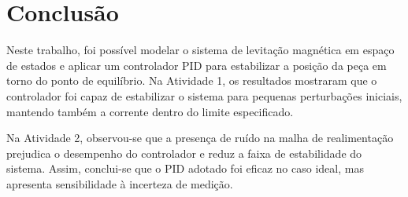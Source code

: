\section{Conclusão}

Neste trabalho, foi possível modelar o sistema de levitação magnética em espaço de estados e aplicar um controlador PID para estabilizar a posição da peça em torno do ponto de equilíbrio. Na Atividade 1, os resultados mostraram que o controlador foi capaz de estabilizar o sistema para pequenas perturbações iniciais, mantendo também a corrente dentro do limite especificado.

Na Atividade 2, observou-se que a presença de ruído na malha de realimentação prejudica o desempenho do controlador e reduz a faixa de estabilidade do sistema. Assim, conclui-se que o PID adotado foi eficaz no caso ideal, mas apresenta sensibilidade à incerteza de medição.